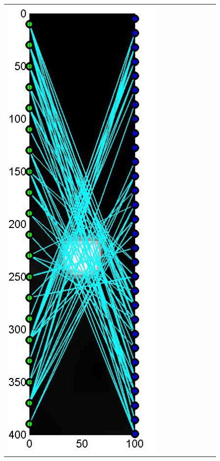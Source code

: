 \documentclass[english]{siamltex}
\begin{document}
{\begin{figure}[!h]
\begin{center}
\begin{tabular}{|c|c|c|c|c|c|c|c|c|}
			\includegraphics[width=.9\iwidth]{figures/newFigs/noisy/resultsExp-5-designs}
			&

\end{tabular}
\end{center}
\end{figure}}
\end{document}
